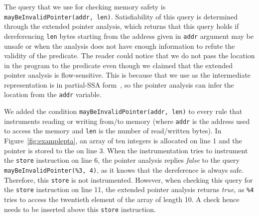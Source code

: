 The query that we use for checking memory safety is
\texttt{mayBeInvalidPointer(addr, len)}.  Satisfiability of this
query is determined through the extended pointer
analysis, which returns that this query holds if dereferencing
\texttt{len} bytes starting from the address given in \texttt{addr}
argument may be unsafe or when the analysis does not have enough
information to refute the validity of the predicate.  The reader could
notice that we do not pass the location in the program to the
predicate even though we claimed that the extended pointer analysis is
flow-sensitive. This is because \llvm that we use as the intermediate
representation is in partial-SSA form~\cite{Lattner04}, so the pointer
analysis can infer the location from the \texttt{addr} variable.

We added the condition \texttt{mayBeInvalidPointer(addr, len)} to every rule
that instruments reading or writing from/to memory (where \texttt{addr} is the
address used to access the memory and \texttt{len} is the number of
read/written bytes). In Figure~\ref{fig:examplepta}, an array of ten integers
is allocated on line 1 and the pointer is stored to the \stacklist on line 3.
When the instrumentation tries to instrument the \texttt{store} instruction on
line 6, the pointer analysis replies \emph{false} to the query
\texttt{mayBeInvalidPointer(\%3, 4)}, as it knows that the dereference is
always safe. Therefore, this \texttt{store} is not instrumented. However, when
checking this query for the \texttt{store} instruction on line 11, the extended
pointer analysis returns \emph{true}, as \texttt{\%4} tries to access the
twentieth element of the array of length 10. A check hence needs to be inserted
above this \texttt{store} instruction.

